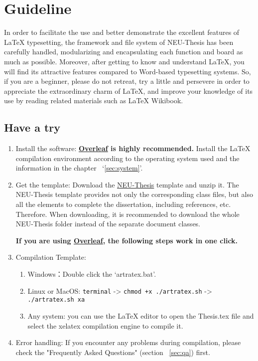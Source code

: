 \chapter{Guideline}\label{chap:guide}

In order to facilitate the use and better demonstrate the excellent features of LaTeX typesetting, the framework and file system of NEU-Thesis has been carefully handled, modularizing and encapsulating each function and board as much as possible. Moreover, after getting to know and understand LaTeX, you will find its attractive features compared to Word-based typesetting systems. So, if you are a beginner, please do not retreat, try a little and persevere in order to appreciate the extraordinary charm of LaTeX, and improve your knowledge of its use by reading related materials such as LaTeX Wikibook\cite {wikibook2014latex}.

\section{Have a try}

\begin{enumerate}
    \item Install the software: \textbf{\href{https://www.overleaf.com/}{Overleaf} is highly recommended.} Install the LaTeX compilation environment according to the operating system used and the information in the chapter ~`\ref{sec:system}'.
    \item Get the template: Download the \href{https://github.com/sci-m-wang/NEU-Thesis-en}{NEU-Thesis} template and unzip it. The NEU-Thesis template provides not only the corresponding class files, but also all the elements to complete the dissertation, including references, etc. Therefore. When downloading, it is recommended to download the whole NEU-Thesis folder instead of the separate document classes.

    \textbf{If you are using \href{https://www.overleaf.com/}{Overleaf}, the following steps work in one click.}
    \item Compilation Template:
        \begin{enumerate}
            \item Windows：Double click the `artratex.bat'.
            \item Linux or MacOS: {\scriptsize \verb|terminal| -> \verb|chmod +x ./artratex.sh| -> \verb|./artratex.sh xa|}
            \item Any system: you can use the LaTeX editor to open the Thesis.tex file and select the xelatex compilation engine to compile it.
        \end{enumerate}
    \item Error handling: If you encounter any problems during compilation, please check the "Frequently Asked Questions" (section ~\ref{sec:qa}) first.
\end{enumerate}

